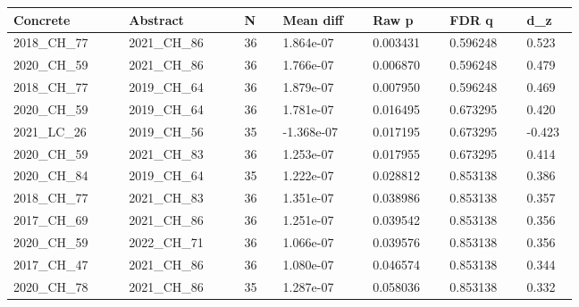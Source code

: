 \begin{tabular}{p{0.18\linewidth}p{0.18\linewidth}p{0.06\linewidth}p{0.14\linewidth}p{0.12\linewidth}p{0.12\linewidth}p{0.08\linewidth}}
\toprule
Concrete & Abstract & N & Mean diff & Raw p & FDR q & d_z\\
\midrule
2018\_CH\_77 & 2021\_CH\_86 & 36 & 1.864e-07 & 0.003431 & 0.596248 & 0.523\\
2020\_CH\_59 & 2021\_CH\_86 & 36 & 1.766e-07 & 0.006870 & 0.596248 & 0.479\\
2018\_CH\_77 & 2019\_CH\_64 & 36 & 1.879e-07 & 0.007950 & 0.596248 & 0.469\\
2020\_CH\_59 & 2019\_CH\_64 & 36 & 1.781e-07 & 0.016495 & 0.673295 & 0.420\\
2021\_LC\_26 & 2019\_CH\_56 & 35 & -1.368e-07 & 0.017195 & 0.673295 & -0.423\\
2020\_CH\_59 & 2021\_CH\_83 & 36 & 1.253e-07 & 0.017955 & 0.673295 & 0.414\\
2020\_CH\_84 & 2019\_CH\_64 & 35 & 1.222e-07 & 0.028812 & 0.853138 & 0.386\\
2018\_CH\_77 & 2021\_CH\_83 & 36 & 1.351e-07 & 0.038986 & 0.853138 & 0.357\\
2017\_CH\_69 & 2021\_CH\_86 & 36 & 1.251e-07 & 0.039542 & 0.853138 & 0.356\\
2020\_CH\_59 & 2022\_CH\_71 & 36 & 1.066e-07 & 0.039576 & 0.853138 & 0.356\\
2017\_CH\_47 & 2021\_CH\_86 & 36 & 1.080e-07 & 0.046574 & 0.853138 & 0.344\\
2020\_CH\_78 & 2021\_CH\_86 & 35 & 1.287e-07 & 0.058036 & 0.853138 & 0.332\\
\bottomrule
\end{tabular}
